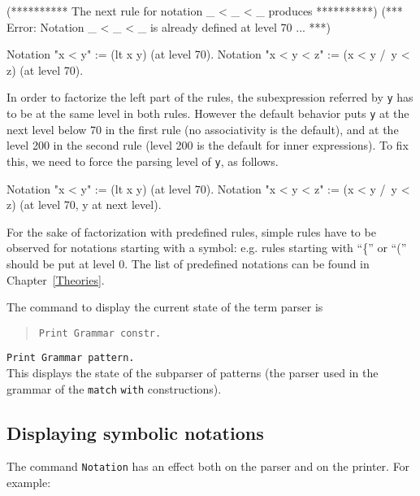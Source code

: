 \begin{coq_eval}
(********** The next rule for notation _ < _ < _  produces **********)
(*** Error: Notation _ < _ < _ is already defined at level 70 ... ***)
\end{coq_eval}
\begin{coq_example*}
Notation "x < y"     := (lt x y) (at level 70).
Notation "x < y < z" := (x < y /\ y < z) (at level 70).
\end{coq_example*}

In order to factorize the left part of the rules, the subexpression
referred by {\tt y} has to be at the same level in both rules. However
the default behavior puts {\tt y} at the next level below 70
in the first rule (no associativity is the default), and at the level
200 in the second rule (level 200 is the default for inner expressions).
To fix this, we need to force the parsing level of {\tt y},
as follows.

\begin{coq_example*}
Notation "x < y"     := (lt x y) (at level 70).
Notation "x < y < z" := (x < y /\ y < z) (at level 70, y at next level).
\end{coq_example*}

For the sake of factorization with {\Coq} predefined rules, simple
rules have to be observed for notations starting with a symbol:
e.g. rules starting with ``\{'' or ``('' should be put at level 0. The
list of {\Coq} predefined notations can be found in Chapter~\ref{Theories}.

The command to display the current state of the {\Coq} term parser is

\begin{quote}
\tt Print Grammar constr.
\end{quote}

\variant

{\tt Print Grammar pattern.}\\

This displays the state of the subparser of patterns (the parser
used in the grammar of the {\tt match} {\tt with} constructions).

\subsection{Displaying symbolic notations}

The command \texttt{Notation} has an effect both on the {\Coq} parser and
on the {\Coq} printer. For example:

